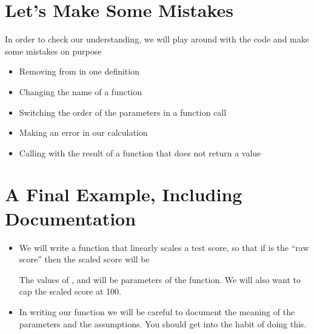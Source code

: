\documentclass[letterpaper,10pt,english]{sphinxmanual}
\begin{document}
\section{Let’s Make Some Mistakes}
\label{\detokenize{lecture_notes/lec05_functions2:lets-make-some-mistakes}}
In order to check our understanding, we will play around with the code
and make some mistakes on purpose
\begin{itemize}
\item {} 
Removing  from  in one definition

\item {} 
Changing the name of a function

\item {} 
Switching the order of the parameters in a function call

\item {} 
Making an error in our calculation

\item {} 
Calling  with the result of a function that does not
return a value

\end{itemize}


\section{A Final Example, Including Documentation}
\label{\detokenize{lecture_notes/lec05_functions2:a-final-example-including-documentation}}\begin{itemize}
\item {} 
We will write a function that linearly scales a test score, so that
if  is the “raw score” then the scaled score will be

%
\begin{sphinxVerbatim}[commandchars=\\\{\}]
    
\end{sphinxVerbatim}

The values of ,  and  will be parameters of the
function.  We will also want to cap the scaled score at 100.

\item {} 
In writing our function we will be careful to document the meaning of
the parameters and the assumptions.  You should get into the habit
of doing this.

\end{itemize}
\end{document}
